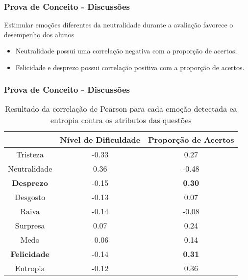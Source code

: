 \begin{frame}
\frametitle{Prova de Conceito - Discussões}
\begin{block}{Estimular emo\c{c}\~oes diferentes da neutralidade durante a avalia\c{c}\~ao favorece o desempenho dos alunos}
\begin{itemize}
\item Neutralidade possui uma correla\c{c}\~ao negativa com a propor\c{c}\~ao de acertos;
\pause
\item Felicidade e desprezo possui correla\c{c}\~ao positiva com a propor\c{c}\~ao de acertos.
\end{itemize}
\end{block}

\end{frame}

\begin{frame}
\frametitle{Prova de Conceito - Discussões}
\begin{table}[]\footnotesize
\centering
\caption{Resultado​ ​da​ ​correla\c{c}\~ao​ ​de​ ​Pearson​ ​para​ ​cada​ ​emo\c{c}\~ao​ ​detectada
e​ ​a​ ​entropia​ ​contra​ ​os​ ​atributos​ ​das​ ​quest\~oes}
\label{my-label}
\begin{tabular}{|c|c|c|}
\hline
                      & \textbf{Nível de Dificuldade} & \textbf{Proporção de Acertos} \\ \hline
Tristeza	     & -0.33                & 0.27                          \\ \hline
Neutralidade & 0.36                 & -0.48                \\ \hline
\small \textbf{Desprezo}     		& -0.15                         & \small \textbf{0.30}                 \\ \hline
Desgosto              & -0.13                         & 0.07                          \\ \hline
Raiva                 & -0.14                         & -0.08                         \\ \hline
Surpresa              & 0.07                          & 0.24                          \\ \hline
Medo                  & -0.06                         & 0.14                          \\ \hline
\small \textbf{Felicidade}   		& -0.14                         & \small \textbf{0.31}                 \\ \hline
Entropia     		& -0.12                         & 0.36                 \\ \hline
\end{tabular}
\end{table}
\end{frame}




